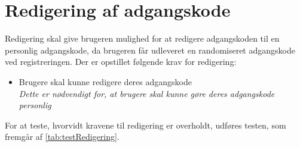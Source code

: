 \section{Redigering af adgangskode}
Redigering skal give brugeren mulighed for at redigere adgangskoden til en personlig adgangskode, da brugeren får udleveret en randomiseret adgangskode ved registreringen. Der er opstillet følgende krav for redigering:

\begin{itemize}
\item Brugere skal kunne redigere deres adgangskode
\\
\textit{Dette er nødvendigt for, at brugere skal kunne gøre deres adgangskode personlig}
\end{itemize}

\noindent
For at teste, hvorvidt kravene til redigering er overholdt, udføres testen, som fremgår af \autoref{tab:testRedigering}.

